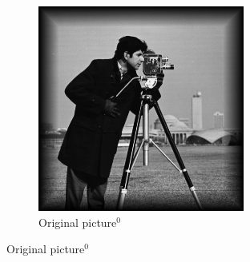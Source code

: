\begin{frame}
  \begin{figure}[!ht]
    \centering
    \begin{subfigure}{.4\linewidth}
      \caption*{Original picture$^0$}
      \includegraphics[width=\linewidth]
        {pictures/recap/denoiseExample/cameraman.png}
    \end{subfigure}
    \quad
\end{figure}
\end{frame}
